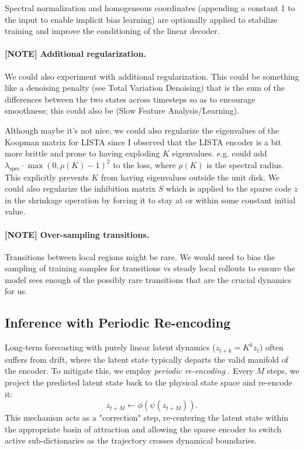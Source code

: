 Spectral normalization and homogeneous coordinates (appending a constant 1 to the input to enable implicit bias learning) are optionally applied to stabilize training and improve the conditioning of the linear decoder.

\paragraph{[NOTE] Additional regularization.} We could also experiment with additional regularization. This could be something like a denoising penalty (see Total Variation Denoising) that is the sum of the differences between the two states across timesteps so as to encourage smoothness; this could also be (Slow Feature Analysis/Learning). 

Although maybe it's not nice, we could also regularize the eigenvalues of the Koopman matrix for LISTA since I observed that the LISTA encoder is a bit more brittle and prone to having exploding $K$ eigenvalues. e.g. could add $\lambda_{\text{spec}} \cdot \max(0, \rho(K) - 1)^2$ to the loss, where $\rho(K)$ is the spectral radius. This explicitly prevents $K$ from having eigenvalues outside the unit disk. We could also regularize the inhibition matrix $S$ which is applied to the sparse code $z$ in the shrinkage operation by forcing it to stay at or within some constant initial value.

\paragraph{[NOTE] Over-sampling transitions.} Transitions between local regions might be rare. We would need to bias the sampling of training samples for transitions vs steady local rollouts to ensure the model sees enough of the possibly rare transitions that are the crucial dynamics for us.

\subsection{Inference with Periodic Re-encoding}
Long-term forecasting with purely linear latent dynamics ($z_{t+k} = K^k z_t$) often suffers from drift, where the latent state typically departs the valid manifold of the encoder. To mitigate this, we employ \textit{periodic re-encoding} \citep{fathi_course_2023}. Every $M$ steps, we project the predicted latent state back to the physical state space and re-encode it:
\begin{equation}
    z_{t+M} \leftarrow \phi(\psi(z_{t+M})).
\end{equation}
This mechanism acts as a "correction" step, re-centering the latent state within the appropriate basin of attraction and allowing the sparse encoder to switch active sub-dictionaries as the trajectory crosses dynamical boundaries.

